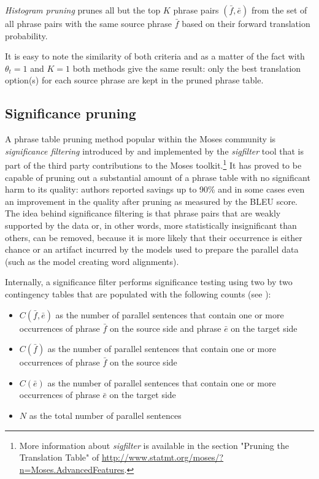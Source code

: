 \emph{Histogram pruning} prunes all but the top $K$ phrase pairs $(\bar{f},\bar{e})$ from the set
of all phrase pairs with the same source phrase $\bar{f}$ based on their forward translation
probability.

It is easy to note the similarity of both criteria and as a matter of the fact with $\theta_{t} = 1$
and $K = 1$ both methods give the same result: only the best translation option(s) for each
source phrase are kept in the pruned phrase table.

\subsection{Significance pruning}
\label{sec:significance-pruning}

A phrase table pruning method popular within the Moses community is \emph{significance filtering}
introduced by \citet{johnson:sigfilter} and implemented by the \emph{sigfilter} tool
that is part of the third party contributions to the Moses toolkit.\footnote{More information
about \emph{sigfilter} is available in the section "Pruning the Translation Table" of
\url{http://www.statmt.org/moses/?n=Moses.AdvancedFeatures}.}
It has proved to be capable of pruning out a substantial amount of a phrase table with no
significant harm to its quality: authors reported savings up to 90\% and in some cases
even an improvement in the quality after pruning as measured by the BLEU score.
The idea behind significance filtering is that phrase pairs that are weakly supported
by the data or, in other words, more statistically insignificant than others, can be
removed, because it is more likely that their occurrence is either chance or an artifact
incurred by the models used to prepare the parallel data (such as the model creating word
alignments).

Internally, a significance filter performs significance testing using two by two
contingency tables that are populated with the following counts (see
):
\begin{itemize}
  \item $C(\bar{f},\bar{e})$ as the number of parallel sentences that contain one or more
    occurrences of phrase $\bar{f}$ on the source side and phrase $\bar{e}$ on the target side
  \item $C(\bar{f})$ as the number of parallel sentences that contain one or more
    occurrences of phrase $\bar{f}$ on the source side
  \item $C(\bar{e})$ as the number of parallel sentences that contain one or more
    occurrences of phrase $\bar{e}$ on the target side
  \item $N$ as the total number of parallel sentences
\end{itemize}

